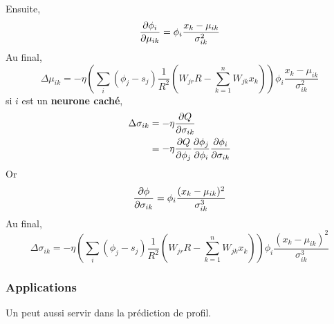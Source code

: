 Ensuite,
\[\frac{\partial \phi_i}{\partial \mu_{ik}} = \phi_i \frac{x_k-\mu_{ik}}{\sigma_{ik}^2}\]
Au final,
\[\Delta\mu_{ik} = -\eta \left(\sum_{i}(\phi_j - s_j) \frac{1}{R^2} \left(W_{jr}R - \sum_{k=1}^{n}W_{jk}x_k\right)\right) \phi_i\frac{x_k-\mu_{ik}}{\sigma_{ik}^2}\]
si $i$ est un \textbf{neurone caché},
\begin{equation}
 \begin{split}
 \Delta \sigma_{ik} & = -\eta \frac{\partial Q}{\partial \sigma_{ik}}\\
 ~ & = -\eta \frac{\partial Q}{\partial \phi_j} \frac{\partial \phi_j}{\partial \phi_i} \frac{\partial \phi_i}{\partial \sigma_{ik}}
 \end{split}
\end{equation}
Or \[\frac{\partial \phi}{\partial \sigma_{ik}} = \phi_i \frac{(x_k-\mu_{ik})^2}{\sigma_{ik}^3}\]
Au final,
\[\Delta \sigma_{ik} = -\eta \left(\sum_{i}(\phi_j - s_j) \frac{1}{R^2} \left(W_{jr}R - \sum_{k=1}^{n}W_{jk}x_k\right)\right) \phi_i \frac{(x_k-\mu_{ik})^2}{\sigma_{ik}^3}\]
\subsubsection{Applications}
Un \rbf peut aussi servir dans la prédiction de profil.\cite{statistica}